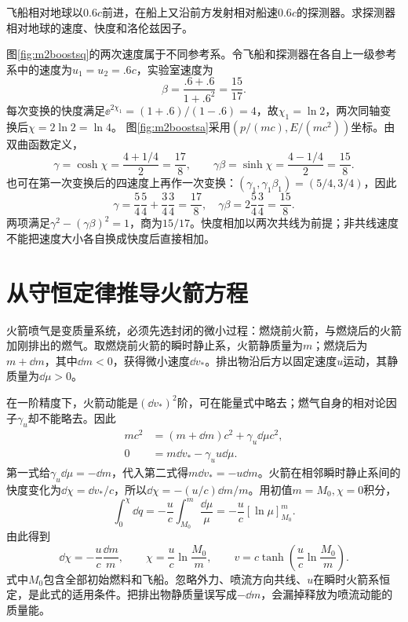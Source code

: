 \begin{example}\label{ex:m2boosts}
飞船相对地球以$0.6c$前进，在船上又沿前方发射相对船速$0.6c$的探测器。求探测器相对地球的速度、快度和洛伦兹因子。
\end{example}
\begin{solution}
图\ref{fig:m2boostsq}的两次速度属于不同参考系。令飞船和探测器在各自上一级参考系中的速度为$u_1=u_2=.6c$，实验室速度为
\[
 \beta=\frac{.6+.6}{1+.6^2}=\frac{15}{17}.
\]
每次变换的快度满足$\ee^{2\chi_1}=(1+.6)/(1-.6)=4$，故$\chi_1=\ln2$，两次同轴变换后$\chi=2\ln2=\ln4$。
图\ref{fig:m2boostsa}采用$(p/(mc),E/(mc^2))$坐标。由双曲函数定义，
\[
 \gamma=\cosh\chi=\frac{4+1/4}{2}=\frac{17}{8},\qquad
 \gamma\beta=\sinh\chi=\frac{4-1/4}{2}=\frac{15}{8}.
\]
也可在第一次变换后的四速度上再作一次变换：$(\gamma_1,\gamma_1\beta_1)=(5/4,3/4)$，因此
\[
 \gamma=\frac54\frac54+\frac34\frac34=\frac{17}{8},\quad
 \gamma\beta=2\frac54\frac34=\frac{15}{8}.
\]
两项满足$\gamma^2-(\gamma\beta)^2=1$，商为$15/17$。快度相加以两次共线为前提；非共线速度不能把速度大小各自换成快度后直接相加。
\end{solution}

\section{从守恒定律推导火箭方程}\label{th:m2rocket}
火箭喷气是变质量系统，必须先选封闭的微小过程：燃烧前火箭，与燃烧后的火箭加刚排出的燃气。取燃烧前火箭的瞬时静止系，火箭静质量为$m$；燃烧后为$m+\dd m$，其中$\dd m<0$，获得微小速度$\dd v_*$。排出物沿后方以固定速度$u$运动，其静质量为$\dd\mu>0$。

在一阶精度下，火箭动能是$(\dd v_*)^2$阶，可在能量式中略去；燃气自身的相对论因子$\gamma_u$却不能略去。因此
\begin{align*}
 mc^2&=(m+\dd m)c^2+\gamma_u\dd\mu c^2,\\
 0&=m\dd v_*-\gamma_u u\dd\mu.
\end{align*}
第一式给$\gamma_u\dd\mu=-\dd m$，代入第二式得$m\dd v_*=-u\dd m$。火箭在相邻瞬时静止系间的快度变化为$\dd\chi=\dd v_*/c$，所以$\dd\chi=-(u/c)\dd m/m$。用初值$m=M_0,\chi=0$积分，
\[
 \int_0^\chi\dd q=-\frac uc\int_{M_0}^{m}\frac{\dd\mu}{\mu}
 =-\frac uc[\ln\mu]_{M_0}^{m}.
\]
由此得到
\begin{equation}\label{eq:m2rocket}
 \dd\chi=-\frac uc\frac{\dd m}m,\qquad
 \chi=\frac uc\ln\frac{M_0}m,\qquad
 v=c\tanh\left(\frac uc\ln\frac{M_0}m\right).
\end{equation}
式中$M_0$包含全部初始燃料和飞船。忽略外力、喷流方向共线、$u$在瞬时火箭系恒定，是此式的适用条件。把排出物静质量误写成$-\dd m$，会漏掉释放为喷流动能的质量能。

